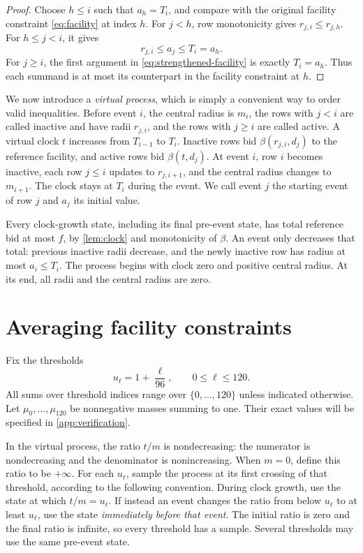 \documentclass[11pt]{article}
\theoremstyle{definition}
\theoremstyle{remark}
\begin{document}
\begin{proof}
Choose $h\le i$ such that $a_h=T_i$, and compare with the original facility
constraint \eqref{eq:facility} at index $h$.
For $j<h$, row monotonicity gives $r_{j,i}\le r_{j,h}$.
For $h\le j<i$, it gives
\[
  r_{j,i}\le a_j\le T_i=a_h.
\]
For $j\ge i$, the first argument in
\eqref{eq:strengthened-facility} is exactly $T_i=a_h$.
Thus each summand is at most its counterpart in the facility constraint
at $h$.
\end{proof}

We now introduce a \emph{virtual process}, which is simply a convenient
way to order valid inequalities. Before event $i$, the central radius is
$m_i$, the rows with $j<i$ are called inactive and have radii $r_{j,i}$, and
the rows with $j\ge i$ are called active. A virtual clock $t$ increases from
$T_{i-1}$ to $T_i$. Inactive rows bid $\beta(r_{j,i},d_j)$ to the reference
facility, and active rows bid $\beta(t,d_j)$.
At event $i$, row $i$ becomes inactive, each row $j\le i$ updates to
$r_{j,i+1}$, and the central radius changes to $m_{i+1}$. The clock stays
at $T_i$ during the event. We call event $j$ the starting event of
row $j$ and $a_j$ its initial value.

Every clock-growth state, including its final pre-event state, has total
reference bid at most $f$, by \cref{lem:clock} and monotonicity of $\beta$.
An event only decreases that total: previous inactive radii decrease, and
the newly inactive row has radius at most $a_i\le T_i$.
The process begins with clock zero and positive central radius. At its end,
all radii and the central radius are zero.

\section{Averaging facility constraints}\label{sec:sampling}

Fix the thresholds
\begin{equation}\label{eq:times}
  u_\ell=1+\frac{\ell}{96},\qquad 0\le\ell\le120.
\end{equation}
All sums over threshold indices range over $\{0,\ldots,120\}$ unless
indicated otherwise. Let $\mu_0,\ldots,\mu_{120}$ be nonnegative masses summing to one. Their
exact values will be specified in \cref{app:verification}.

In the virtual process, the ratio $t/m$ is nondecreasing: the numerator is
nondecreasing and the denominator is nonincreasing. When $m=0$, define this
ratio to be $+\infty$. For each $u_\ell$, sample the process at its first
crossing of that threshold, according to the following convention.
During clock growth, use the state at which $t/m=u_\ell$. If instead an event
changes the ratio from below $u_\ell$ to at least $u_\ell$, use the state
\emph{immediately before that event}. The initial ratio is zero and the final
ratio is infinite, so every threshold has a sample. Several thresholds may
use the same pre-event state.
\end{document}
